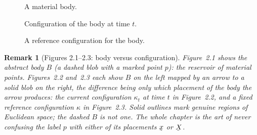 \documentclass[17pt,a4paper]{extreport}
\DeclareRobustCommand{\vek}[1]{\underaccent{\tilde}{#1}}
\newcommand{\blob}[1]{\draw[#1] plot[smooth cycle,tension=0.85] coordinates
  {(0,1.05) (1.15,0.72) (1.5,-0.35) (0.6,-1.15) (-0.75,-0.95) (-1.3,0.05)};}
\newcommand{\bx}{\vek{x}}
\newcommand{\bX}{\vek{X}}
\newcommand{\bchi}{\vek{\chi}}
\newcommand{\bkappa}{\vek{\kappa}}
\theoremstyle{scplain}
\theoremstyle{scdefn}
\newtheorem{remark}[theorem]{Remark}
\begin{document}
\begin{figure}[htbp]\centering
{}
\caption{A material body.}\label{fig:2.1}
\end{figure}

\begin{figure}[htbp]\centering
{}
\caption{Configuration of the body at time $t$.}\label{fig:2.2}
\end{figure}

\begin{figure}[htbp]\centering
{}
\caption{A reference configuration for the body.}\label{fig:2.3}
\end{figure}

\begin{remark}[Figures 2.1--2.3: body versus configuration]\label{rem:fig123}
Figure~2.1 shows the abstract body $B$ (a dashed blob with a marked point
$p$): the reservoir of material points. Figures~2.2 and~2.3 each show $B$ on
the left mapped by an arrow to a \emph{solid} blob on the right, the
difference being only which placement of the body the arrow produces: the
\emph{current} configuration $\kappa_t$ at time $t$ in Figure~2.2, and a
fixed \emph{reference} configuration $\kappa$ in Figure~2.3. Solid outlines
mark genuine regions of Euclidean space; the dashed $B$ is not one. The
whole chapter is the art of never confusing the label $p$ with either of
its placements $\bx$ or $\bX$.
\end{remark}
\end{document}

